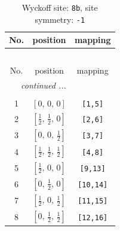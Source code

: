 \documentclass[fleqn,8pt]{jsarticle}
\begin{document}
\begin{longtable}{ccc}
\caption{Wyckoff site: {\tt 8b}, site symmetry: {\tt -1}}
 \\
 \hline \hline
No. & position & mapping \\ \hline \endfirsthead

\multicolumn{2}{l}{\tablename\ \thetable{}} \\
 \hline \hline
No. & position & mapping \\ \hline \endhead

 \hline \hline
\multicolumn{2}{r}{\footnotesize\it continued ...} \\ \endfoot

 \hline \hline
\multicolumn{2}{r}{} \\ \endlastfoot

1 & $\left[ 0,\, 0,\, 0 \right]$ & {\tt [1,5]} \\ \hline
2 & $\left[ \frac{1}{2},\, \frac{1}{2},\, 0 \right]$ & {\tt [2,6]} \\ \hline
3 & $\left[ 0,\, 0,\, \frac{1}{2} \right]$ & {\tt [3,7]} \\ \hline
4 & $\left[ \frac{1}{2},\, \frac{1}{2},\, \frac{1}{2} \right]$ & {\tt [4,8]} \\ \hline
5 & $\left[ \frac{1}{2},\, 0,\, 0 \right]$ & {\tt [9,13]} \\ \hline
6 & $\left[ 0,\, \frac{1}{2},\, 0 \right]$ & {\tt [10,14]} \\ \hline
7 & $\left[ \frac{1}{2},\, 0,\, \frac{1}{2} \right]$ & {\tt [11,15]} \\ \hline
8 & $\left[ 0,\, \frac{1}{2},\, \frac{1}{2} \right]$ & {\tt [12,16]} \\
\end{longtable}
\renewcommand{\arraystretch}{1.2}
\end{document}
